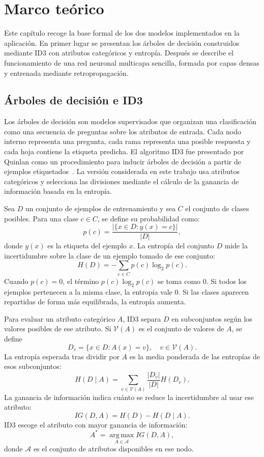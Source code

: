 \chapter{Marco teórico}
\label{chap:marco_teorico}

Este capítulo recoge la base formal de los dos modelos implementados en la aplicación.
En primer lugar se presentan los árboles de decisión construidos mediante ID3 con atributos categóricos y entropía.
Después se describe el funcionamiento de una red neuronal multicapa sencilla, formada por capas densas y entrenada mediante retropropagación.


\section{Árboles de decisión e ID3}
\label{sec:marco_arboles_id3}

Los árboles de decisión son modelos supervisados que organizan una clasificación como una secuencia de preguntas sobre los atributos de entrada.
Cada nodo interno representa una pregunta, cada rama representa una posible respuesta y cada hoja contiene la etiqueta predicha.
El algoritmo ID3 fue presentado por Quinlan como un procedimiento para inducir árboles de decisión a partir de ejemplos etiquetados~\cite{QuinlanID3}.
La versión considerada en este trabajo usa atributos categóricos y selecciona las divisiones mediante el cálculo de la ganancia de información basada en la entropía.

Sea \(D\) un conjunto de ejemplos de entrenamiento y sea \(C\) el conjunto de clases posibles.
Para una clase \(c \in C\), se define su probabilidad como:
\[
p(c) = \frac{|\{x \in D : y(x)=c\}|}{|D|},
\]
donde \(y(x)\) es la etiqueta del ejemplo \(x\).
La entropía del conjunto \(D\) mide la incertidumbre sobre la clase de un ejemplo tomado de ese conjunto:
\[
H(D) = -\sum_{c \in C} p(c)\log_2 p(c).
\]
Cuando \(p(c)=0\), el término \(p(c)\log_2 p(c)\) se toma como 0.
Si todos los ejemplos pertenecen a la misma clase, la entropía vale 0.
Si las clases aparecen repartidas de forma más equilibrada, la entropía aumenta.

Para evaluar un atributo categórico \(A\), ID3 separa \(D\) en subconjuntos según los valores posibles de ese atributo.
Si \(\mathcal{V}(A)\) es el conjunto de valores de \(A\), se define
\[
D_v = \{x \in D : A(x)=v\}, \quad v \in \mathcal{V}(A).
\]
La entropía esperada tras dividir por \(A\) es la media ponderada de las entropías de esos subconjuntos:
\[
H(D \mid A) = \sum_{v \in \mathcal{V}(A)} \frac{|D_v|}{|D|} H(D_v).
\]
La ganancia de información indica cuánto se reduce la incertidumbre al usar ese atributo:
\[
IG(D,A) = H(D) - H(D \mid A).
\]
ID3 escoge el atributo con mayor ganancia de información:
\[
A^* = \operatorname*{arg\,max}_{A \in \mathcal{A}} IG(D,A),
\]
donde \(\mathcal{A}\) es el conjunto de atributos disponibles en ese nodo.

